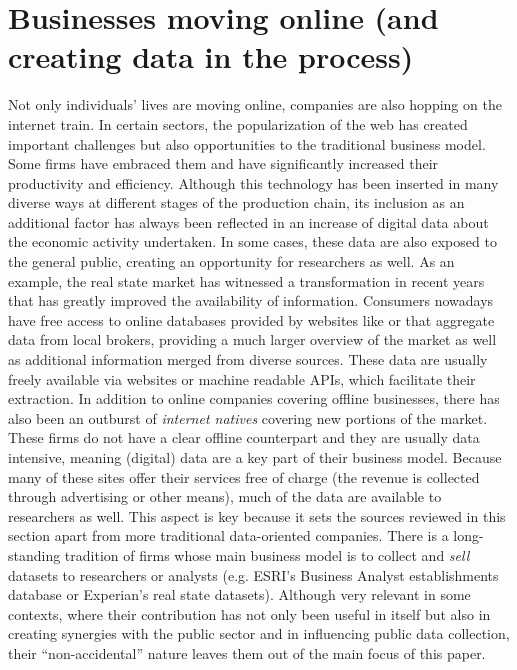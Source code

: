 \documentclass[12pt]{article}
\begin{document}
\section{Businesses moving online (and creating data in the process)}
\label{web}
Not only individuals' lives are moving online, companies are also hopping on
the internet train. 
In certain sectors, the popularization of the web has created important challenges but
also opportunities to the traditional business model. Some firms have embraced
them and have significantly increased their productivity and efficiency.
Although this technology has been inserted in many diverse ways at different stages of
the production chain, its inclusion as an additional factor has
always been reflected in an increase of digital
data about the economic activity undertaken.
%
In some cases, these data are
also exposed to the general public, creating an opportunity for
researchers as well. As an example, the real state
market has witnessed a transformation in recent years that has greatly
improved the availability of information. Consumers nowadays have free access
to online databases provided by websites like \cite{zillow}
or \cite{trulia} that aggregate data from local
brokers, providing a much larger overview of the market as well as additional
information merged from diverse sources. These data are usually freely
available via websites or machine readable APIs, which facilitate
their extraction.
In addition to online companies covering offline businesses, there
has also been an outburst of \textit{internet natives} covering new portions
of the market. These firms do not have a clear offline counterpart and they
are usually data intensive, meaning (digital) data are a key part of their
business model.
Because many of these sites offer their services free of charge (the revenue
is collected through advertising or other means), much of the data are
available to researchers as well.
This aspect is key because it sets the sources reviewed in this section apart
from more traditional data-oriented companies. There is a
long-standing tradition of firms whose main business model is to collect and
\textit{sell} datasets to researchers or analysts
(e.g. ESRI's Business Analyst establishments database or Experian's real state
datasets). Although very relevant in some contexts, where their contribution has not
only been useful in itself but also in creating synergies with the public
sector and in influencing public data collection, their ``non-accidental''
nature leaves them out of the main focus of this paper.
\end{document}
